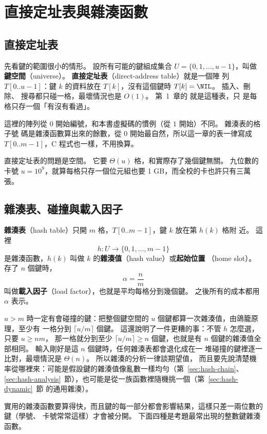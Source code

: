 \section{直接定址表與雜湊函數}
\label{sec:hash-func}

\subsection{直接定址表}

先看鍵的範圍很小的情形。 設所有可能的鍵組成集合 $U = \{0, 1, \ldots, u - 1\}$，叫做
\textbf{鍵空間}（universe）。 \textbf{直接定址表}（direct-address table）就是一個陣
列 $T[0..u-1]$：鍵 $k$ 的資料放在 $T[k]$，沒有這個鍵時 $T[k] = \NIL$。 插入、刪除、
搜尋都只碰一格，最壞情況也是 $O(1)$。 第~1~章的  就是這種表，只
是每格只存一個「有沒有看過」。

這裡的陣列從 $0$ 開始編號，和本書虛擬碼的慣例（從 $1$ 開始）不同。 雜湊表的格子號
碼是雜湊函數算出來的餘數，從 $0$ 開始最自然，所以這一章的表一律寫成
$T[0..m-1]$，C 程式也一樣，不用換算。

直接定址表的問題是空間。 它要 $\Theta(u)$ 格，和實際存了幾個鍵無關。 九位數的卡號
$u = 10^9$，就算每格只存一個位元組也要 1 GB，而全校的卡也許只有三萬張。

\subsection{雜湊表、碰撞與載入因子}

\textbf{雜湊表}（hash table）只開 $m$ 格，$T[0..m-1]$，鍵 $k$ 放在第 $h(k)$ 格附
近。 這裡
\[
h : U \to \{0, 1, \ldots, m - 1\}
\]
是雜湊函數，$h(k)$ 叫做 $k$ 的\textbf{雜湊值}（hash value）或\textbf{起始位置}
（home slot）。 存了 $n$ 個鍵時，
\[
\alpha = \frac{n}{m}
\]
叫做\textbf{載入因子}（load factor），也就是平均每格分到幾個鍵。 之後所有的成本都用
$\alpha$ 表示。

$u > m$ 時一定有會碰撞的鍵：把整個鍵空間的 $u$ 個鍵都算一次雜湊值，由鴿籠原理，至少有
一格分到 $\lceil u/m \rceil$ 個鍵。 這還說明了一件更糟的事：不管 $h$ 怎麼選，只要 $u \ge nm$，
那一格就分到至少 $\lceil u/m \rceil \ge n$ 個鍵，也就是有 $n$ 個鍵的雜湊值全部相同。 輸入剛好是這 $n$ 個鍵時，任何雜湊表都會退化成在一
堆碰撞的鍵裡逐一比對，最壞情況是 $\Theta(n)$。 所以雜湊的分析一律談期望值，
而且要先說清楚機率從哪裡來：可能是假設鍵的雜湊值像亂數一樣均勻（第~\ref{sec:hash-chain}、
\ref{sec:hash-analysis}~節），也可能是從一族函數裡隨機挑一個（第~\ref{sec:hash-dynamic}~節
的通用雜湊）。

實用的雜湊函數要算得快，而且鍵的每一部分都會影響結果，這樣只差一兩位數的鍵（學號、
卡號常常這樣）才會被分開。 下面四種是考題最常出現的整數鍵雜湊函數。

